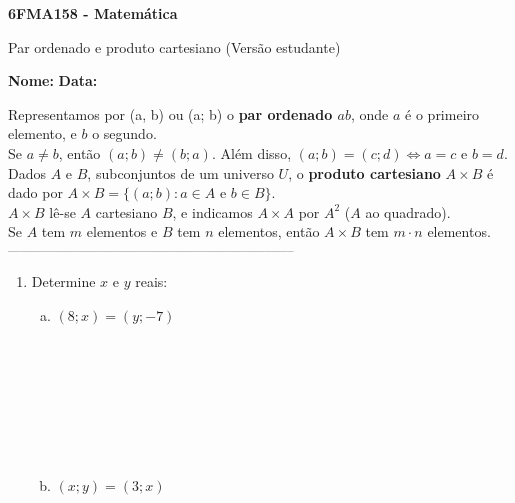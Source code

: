 \documentclass[a4paper,14pt]{article}
\begin{document}
	
	\noindent\textbf{6FMA158 - Matemática} 
	
	\begin{center}Par ordenado e produto cartesiano (Versão estudante)
	\end{center}
	
	\noindent\textbf{Nome:} \underline{\hspace{10cm}}
	\noindent\textbf{Data:} \underline{\hspace{4cm}}
	
	
	\begin{multicols}{2}
	    \noindent Representamos por (a, b) ou (a; b) o \textbf{par ordenado $ab$}, onde $a$ é o primeiro elemento, e $b$ o segundo. \\
	    Se $a \neq b$, então $(a; b) \neq (b; a)$. Além disso, $(a; b) = (c; d) \Leftrightarrow a = c$ e $b = d$. \\
	    Dados $A$ e $B$, subconjuntos de um universo $U$, o \textbf{produto cartesiano} $A \times B$ é dado por $A \times B = \{(a; b) : a \in A $ e $b \in B\}$. \\
	    $A \times B$ lê-se $A$ cartesiano $B$, e indicamos $A \times A$ por $A^2$ ($A$ ao quadrado). \\
	    Se $A$ tem $m$ elementos e $B$ tem $n$ elementos, então $A \times B$ tem $m \cdot n$ elementos.
		\noindent\textsubscript{--------------------------------------------------------------------------}
		\begin{enumerate} 
			\item Determine $x$ e $y$ reais:
			\begin{enumerate}[a)]
				\item $(8; x) = (y; -7)$ \\\\\\\\\\\\\\\\
				\item $(x; y) = (3; x)$ \\\\\\\\\\\\\\\\

\end{enumerate}
\end{enumerate}
\end{multicols}
\end{document}
